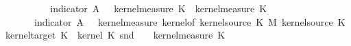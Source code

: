 \begin{isabellebody}
\ \ \isamarkupfalse%
\isanewline
\ \ \isamarkupfalse%
\ {}{\isacharcolon}{\kern0pt}\ {\isachardoublequoteopen}{\isacharparenleft}{\kern0pt}{\isasymintegral}\isactrlsup {\isacharplus}{\kern0pt}{\isasymomega}\ {\isacharparenleft}{\kern0pt}{\isasymintegral}\isactrlsup {\isacharplus}{\kern0pt}{\isasymomega}\ indicator\ A\ {\isacharparenleft}{\kern0pt}{\isasymomega}\ {\isasymomega}\ {\isasympartial}kernel{\isacharunderscore}{\kern0pt}measure\ K{\isacharunderscore}{\kern0pt}{}\ {\isasymomega}\ {\isasympartial}kernel{\isacharunderscore}{\kern0pt}measure\ K{\isacharunderscore}{\kern0pt}{}\ {\isasymomega}\ {\isacharequal}{\kern0pt}\isanewline
\ \ {\isasymintegral}\isactrlsup {\isacharplus}{\kern0pt}\ {\isasymomega}\ {\isasymintegral}\isactrlsup {\isacharplus}{\kern0pt}\ {\isasymomega}\ indicator\ A\ {\isacharparenleft}{\kern0pt}{\isasymomega}\ {\isasymomega}\ {\isasympartial}kernel{\isacharunderscore}{\kern0pt}measure\ {\isacharparenleft}{\kern0pt}kernel{\isacharunderscore}{\kern0pt}of\ {\isacharparenleft}{\kern0pt}kernel{\isacharunderscore}{\kern0pt}source\ K{\isacharunderscore}{\kern0pt}{}\ {\isasymOtimes}\isactrlsub M\ kernel{\isacharunderscore}{\kern0pt}source\ K{\isacharunderscore}{\kern0pt}{}{\isacharparenright}{\kern0pt}\ {\isacharparenleft}{\kern0pt}kernel{\isacharunderscore}{\kern0pt}target\ K{\isacharunderscore}{\kern0pt}{}{\isacharparenright}{\kern0pt}\ {\isacharparenleft}{\kern0pt}{\isasymlambda}{\isasymomega}{\isachardot}{\kern0pt}\ kernel\ K{\isacharunderscore}{\kern0pt}{}\ {\isacharparenleft}{\kern0pt}snd\ {\isasymomega}{\isacharparenright}{\kern0pt}{\isacharparenright}{\kern0pt}{\isacharparenright}{\kern0pt}\ {\isacharparenleft}{\kern0pt}{\isasymomega}\ {\isasymomega}\ {\isasympartial}kernel{\isacharunderscore}{\kern0pt}measure\ K{\isacharunderscore}{\kern0pt}{}\ {\isasymomega}\isanewline

\end{isabellebody}

